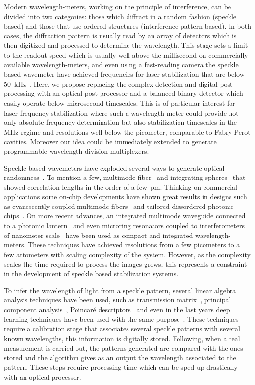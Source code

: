 \documentclass{optica-article}
\begin{document}
Modern wavelength-meters, working on the principle of interference, can be divided into two categories: those which diffract in a random fashion (speckle based) and those that use ordered structures (interference pattern based). In both cases, the diffraction pattern is usually read by an array of detectors which is then digitized and processed to determine the wavelength. This stage sets a limit to the readout speed which is usually well above the millisecond on commercially available wavelength-meters, and even using a fast-reading camera the speckle based wavemeter have achieved frequencies for laser stabilization that are below 50~kHz~\cite{metzger2017harnessing}. Here, we propose replacing the complex detection and digital post-processing with an optical post-processor and a balanced binary detector which easily operate below microsecond timescales. This is of particular interest for laser-frequency stabilization where such a wavelength-meter could provide not only absolute frequency determination but also stabilization timescales in the MHz regime and resolutions well below the picometer, comparable to Fabry-Perot cavities. Moreover our idea could be immediately extended to generate programmable wavelength division multiplexers.

Speckle based wavemeters have exploded several ways to generate optical randomness~\cite{cao2017perspective, wan2021review}. To mention a few, multimode fiber~\cite{redding2012using} and integrating spheres~\cite{metzger2017harnessing} that showed correlation lengths in the order of a few~pm. Thinking on commercial applications some on-chip developments have shown great results in designs such as evanescently coupled multimode fibers~\cite{redding2016evanescently} and tailored dissordered photonic chips~\cite{redding2013compact,hartmann2020broadband}. On more recent advances, an integrated multimode waveguide connected to a photonic lantern~\cite{yi2020integrated} and even microring resonators coupled to interferometers of nanometer scale~\cite{zhang2021compact} have been used as compact and integrated wavelength-meters.
These techniques have achieved resolutions from a few picometers to a few attometers with scaling complexity of the system. However, as the complexity scales the time required to process the images grows, this represents a constraint in the development of speckle based stabilization systems.

To infer the wavelength of light from a speckle pattern, several linear algebra analysis techniques have been used, such as transmission matrix~\cite{cao2017perspective}, principal component analysis~\cite{metzger2017harnessing}, Poincaré descriptors~\cite{o2020high} and even in the last years deep learning techniques have been used with the same purpose~\cite{gupta2020deep}.
These techniques require a calibration stage that associates several speckle patterns with several known wavelengths, this information is digitally stored. Following, when a real measurement is carried out, the patterns generated are compared with the ones stored and the algorithm gives as an output the wavelength associated to the pattern. These steps require processing time which can be sped up drastically with an optical processor. 
\end{document}
